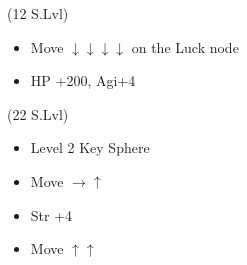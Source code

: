 \begin{spheregrid}
    \begin{itemize}
        \kimahrif (12 S.Lvl)
        \begin{itemize}
            \item Move $\downarrow\downarrow\downarrow\downarrow$ on the Luck node
            \item HP +200, Agi+4
        \end{itemize}
        \tidusf (22 S.Lvl)
        \begin{itemize}
            \item Level 2 Key Sphere
            \item Move $\rightarrow\uparrow$
            \item Str +4
            \item Move $\uparrow\uparrow$

\end{itemize}
\end{itemize}
\end{spheregrid}
